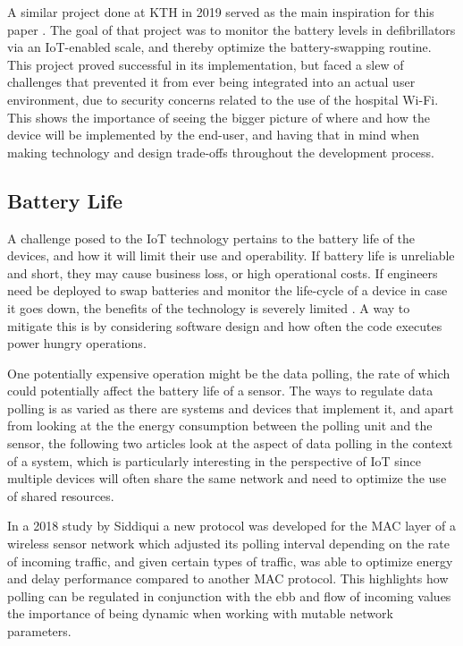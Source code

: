 A similar project done at KTH in 2019 served as the main inspiration for this paper \cite{hospital}. The goal of that project was to monitor the battery levels in defibrillators via an IoT-enabled scale, and thereby optimize the battery-swapping routine. This project proved successful in its implementation, but faced a slew of challenges that prevented it from ever being integrated into an actual user environment, due to security concerns related to the use of the hospital Wi-Fi. This shows the importance of seeing the bigger picture of where and how the device will be implemented by the end-user, and having that in mind when making technology and design trade-offs throughout the development process.

\subsection{Battery Life}
A challenge posed to the IoT technology pertains to the battery life of the devices, and how it will limit their use and operability. If battery life is unreliable and short, they may cause business loss, or high operational costs. If engineers need be deployed to swap batteries and monitor the life-cycle of a device in case it goes down, the benefits of the technology is severely limited \cite{iot-battery}. A way to mitigate this is by considering software design and how often the code executes power hungry operations. 

One potentially expensive operation might be the data polling, the rate of which could potentially affect the battery life of a sensor. The ways to regulate data polling is as varied as there are systems and devices that implement it, and apart from looking at the the energy consumption between the polling unit and the sensor, the following two articles look at the aspect of data polling in the context of a system, which is particularly interesting in the perspective of IoT since multiple devices will often share the same network and need to optimize the use of shared resources.

In a 2018 study by Siddiqui \etal \cite{ADP-MAC} a new protocol was developed for the MAC layer of a wireless sensor network which adjusted its polling interval depending on the rate of incoming traffic, and given certain types of traffic, was able to optimize energy and delay performance compared to another MAC protocol. This highlights how polling can be regulated in conjunction with the ebb and flow of incoming values the importance of being dynamic when working with mutable network parameters.

